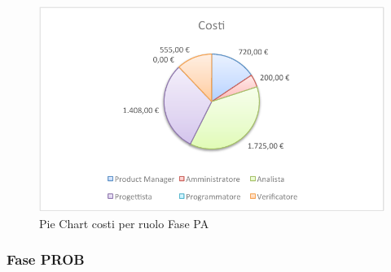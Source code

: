 				\begin{figure}[H]\centering
					\includegraphics[width=\textwidth]{PianoDiProgetto/Pics/ChartTotCostiFasePA.pdf}
					\caption{Pie Chart costi per ruolo Fase PA}
				\end{figure}
		\subsubsection{Fase PROB}
